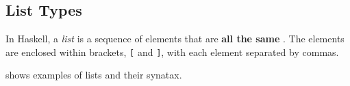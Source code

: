 \subsection{List Types}\label{subsec:List_Types}
\begin{definition}[List]\label{def:List}
  In Haskell, a \emph{list} is a sequence of elements that are \textbf{all the same }.
  The elements are enclosed within brackets, \texttt{[} and \texttt{]}, with each element separated by commas.

   shows examples of lists and their synatax.
\end{definition}


